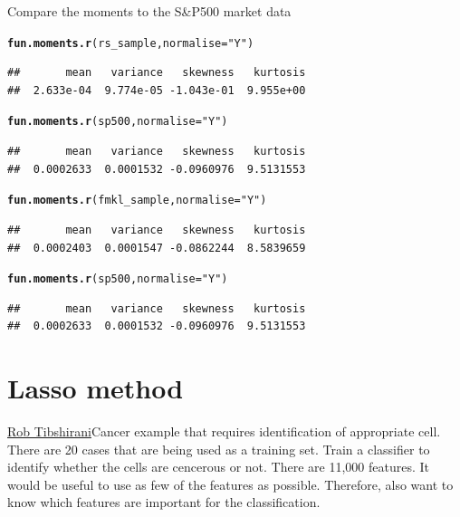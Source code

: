 \documentclass[12pt, a4paper, oneside]{article}\usepackage[]{graphicx}\usepackage[]{color}
\makeatletter
\newcommand{\hlstr}[1]{\textcolor[rgb]{0.192,0.494,0.8}{#1}}%
\newcommand{\hlstd}[1]{\textcolor[rgb]{0.345,0.345,0.345}{#1}}%
\newcommand{\hlkwc}[1]{\textcolor[rgb]{0.333,0.667,0.333}{#1}}%
\newcommand{\hlkwd}[1]{\textcolor[rgb]{0.737,0.353,0.396}{\textbf{#1}}}%
\newenvironment{kframe}{%
 \def\at@end@of@kframe{}%
 \ifinner\ifhmode%
  \def\at@end@of@kframe{\end{minipage}}%
  \begin{minipage}{\columnwidth}%
 \fi\fi%
 \def\FrameCommand##1{\hskip\@totalleftmargin \hskip-\fboxsep
 \colorbox{shadecolor}{##1}\hskip-\fboxsep
     \hskip-\linewidth \hskip-\@totalleftmargin \hskip\columnwidth}%
 \MakeFramed {\advance\hsize-\width
   \@totalleftmargin\z@ \linewidth\hsize
   \@setminipage}}%
 {\par\unskip\endMakeFramed%
 \at@end@of@kframe}
\newenvironment{knitrout}{}{} %
\makeatother
\begin{document}
Compare the moments to the S\&P500 market data
\begin{knitrout}
\color{fgcolor}\begin{kframe}
\begin{alltt}
\hlkwd{fun.moments.r}\hlstd{(rs_sample,} \hlkwc{normalise} \hlstd{=} \hlstr{"Y"}\hlstd{)}
\end{alltt}
\begin{verbatim}
##       mean   variance   skewness   kurtosis 
##  2.633e-04  9.774e-05 -1.043e-01  9.955e+00
\end{verbatim}
\begin{alltt}
\hlkwd{fun.moments.r}\hlstd{(sp500,} \hlkwc{normalise} \hlstd{=} \hlstr{"Y"}\hlstd{)}
\end{alltt}
\begin{verbatim}
##       mean   variance   skewness   kurtosis 
##  0.0002633  0.0001532 -0.0960976  9.5131553
\end{verbatim}
\begin{alltt}
\hlkwd{fun.moments.r}\hlstd{(fmkl_sample,} \hlkwc{normalise} \hlstd{=} \hlstr{"Y"}\hlstd{)}
\end{alltt}
\begin{verbatim}
##       mean   variance   skewness   kurtosis 
##  0.0002403  0.0001547 -0.0862244  8.5839659
\end{verbatim}
\begin{alltt}
\hlkwd{fun.moments.r}\hlstd{(sp500,} \hlkwc{normalise} \hlstd{=} \hlstr{"Y"}\hlstd{)}
\end{alltt}
\begin{verbatim}
##       mean   variance   skewness   kurtosis 
##  0.0002633  0.0001532 -0.0960976  9.5131553
\end{verbatim}
\end{kframe}
\end{knitrout}

\section{Lasso method}
\href{http://www.mathtube.org/lecture/video/lasso-brief-review-and-new-significance-test#.U1aODV1sp94.twitter}{Rob Tibshirani}Cancer example that requires identification of appropriate cell. There are 20 cases that are being used as a training set.  Train a classifier to identify whether the cells are cencerous or not.  There are 11,000 features. It would be useful to use as few of the features as possible. Therefore, also want to know which features are important for the classification. 
\end{document}
